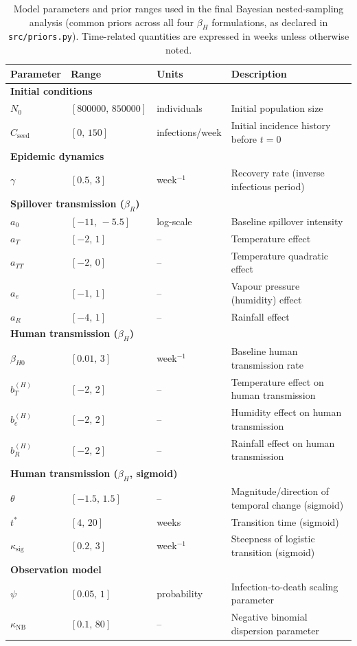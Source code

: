 \begin{table}[!htbp]
\centering
\caption{Model parameters and prior ranges used in the final Bayesian nested-sampling analysis (common priors across all four $\beta_H$ formulations, as declared in \texttt{src/priors.py}). Time-related quantities are expressed in weeks unless otherwise noted.}
\label{tab:supp_parameter_ranges}
\begin{tabularx}{\textwidth}{l l l X}
\hline
Parameter & Range & Units & Description \\
\hline
\multicolumn{4}{l}{\textbf{Initial conditions}} \\
$N_0$ & $[800000,\,850000]$ & individuals & Initial population size \\
$C_{\mathrm{seed}}$ & $[0,\,150]$ & infections/week & Initial incidence history before $t=0$ \\
\multicolumn{4}{l}{\textbf{Epidemic dynamics}} \\
$\gamma$ & $[0.5,\,3]$ & week$^{-1}$ & Recovery rate (inverse infectious period) \\
\multicolumn{4}{l}{\textbf{Spillover transmission ($\beta_R$)}} \\
$a_0$ & $[-11,\,-5.5]$ & log-scale & Baseline spillover intensity \\
$a_T$ & $[-2,\,1]$ & -- & Temperature effect \\
$a_{TT}$ & $[-2,\,0]$ & -- & Temperature quadratic effect \\
$a_e$ & $[-1,\,1]$ & -- & Vapour pressure (humidity) effect \\
$a_R$ & $[-4,\,1]$ & -- & Rainfall effect \\
\multicolumn{4}{l}{\textbf{Human transmission ($\beta_H$)}} \\
$\beta_{H0}$ & $[0.01,\,3]$ & week$^{-1}$ & Baseline human transmission rate \\
$b_T^{(H)}$ & $[-2,\,2]$ & -- & Temperature effect on human transmission \\
$b_e^{(H)}$ & $[-2,\,2]$ & -- & Humidity effect on human transmission \\
$b_R^{(H)}$ & $[-2,\,2]$ & -- & Rainfall effect on human transmission \\
\multicolumn{4}{l}{\textbf{Human transmission ($\beta_H$, sigmoid)}} \\
$\theta$ & $[-1.5,\,1.5]$ & -- & Magnitude/direction of temporal change (sigmoid) \\
$t^{*}$ & $[4,\,20]$ & weeks & Transition time (sigmoid) \\
$\kappa_{\mathrm{sig}}$ & $[0.2,\,3]$ & week$^{-1}$ & Steepness of logistic transition (sigmoid) \\
\multicolumn{4}{l}{\textbf{Observation model}} \\
$\psi$ & $[0.05,\,1]$ & probability & Infection-to-death scaling parameter \\
$\kappa_{\mathrm{NB}}$ & $[0.1,\,80]$ & -- & Negative binomial dispersion parameter \\
\hline
\end{tabularx}
\end{table}
